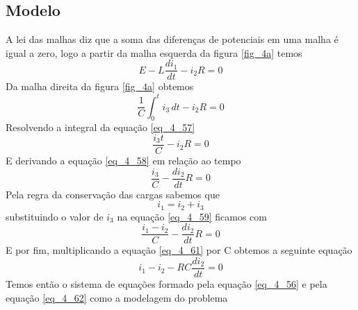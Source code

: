 \documentclass[12pt]{article}
\begin{document}
\subsection{Modelo}
A lei das malhas diz que a soma das diferenças de potenciais em uma malha é igual a zero, logo a partir da malha esquerda da figura \ref{fig_4a} temos
\begin{equation}
    E - L \frac{di_1}{dt} - i_2R = 0
\label{eq_4_56}
\end{equation}
Da malha direita da figura \ref{fig_4a} obtemos
\begin{equation}
    \frac{1}{C} \int_{0}^{t} i_3\,dt - i_2R = 0
\label{eq_4_57}
\end{equation}
Resolvendo a integral da equação \ref{eq_4_57}
\begin{equation}
    \frac{i_3t}{C} - i_2R = 0
\label{eq_4_58}
\end{equation}
E derivando a equação \ref{eq_4_58} em relação ao tempo
\begin{equation}
    \frac{i_3}{C} - \frac{di_2}{dt}R = 0
\label{eq_4_59}
\end{equation}
Pela regra da conservação das cargas sabemos que 
\begin{equation}
    i_1 = i_2 + i_3
\label{eq_4_60}
\end{equation}
substituindo o valor de $i_3$ na equação \ref{eq_4_59} ficamos com
\begin{equation}
    \frac{i_1-i_2}{C} - \frac{di_2}{dt}R = 0
\label{eq_4_61}
\end{equation}
E por fim, multiplicando a equação \ref{eq_4_61} por C obtemos a seguinte equação
\begin{equation}
    i_1-i_2 - RC\frac{di_2}{dt} = 0
\label{eq_4_62}
\end{equation}
Temos então o sistema de equações formado pela equação \ref{eq_4_56} e pela equação \ref{eq_4_62} como a modelagem do problema 
\end{document}
